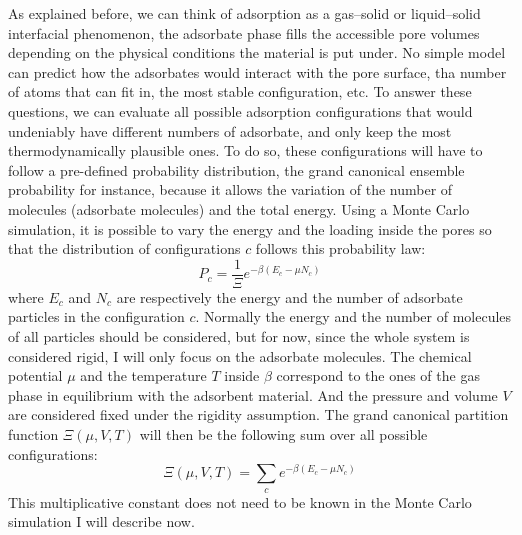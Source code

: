 \documentclass[main.tex]{subfiles}
\begin{document}
As explained before, we can think of adsorption as a gas--solid or liquid--solid interfacial phenomenon, the adsorbate phase fills the accessible pore volumes depending on the physical conditions the material is put under. No simple model can predict how the adsorbates would interact with the pore surface, tha number of atoms that can fit in, the most stable configuration, etc. To answer these questions, we can evaluate all possible adsorption configurations that would undeniably have different numbers of adsorbate, and only keep the most thermodynamically plausible ones. To do so, these configurations will have to follow a pre-defined probability distribution, the grand canonical ensemble probability for instance, because it allows the variation of the number of molecules (adsorbate molecules) and the total energy. Using a Monte Carlo simulation, it is possible to vary the energy and the loading inside the pores so that the distribution of configurations $c$ follows this probability law: 
\begin{equation}\label{eq:gc}
  P_c = \dfrac{1}{\Xi}e^{-\beta\left(E_c-\mu N_c\right)} 
\end{equation}
where $E_c$ and $N_c$ are respectively the energy and the number of adsorbate particles in the configuration $c$. Normally the energy and the number of molecules of all particles should be considered, but for now, since the whole system is considered rigid, I will only focus on the adsorbate molecules. The chemical potential $\mu$ and the temperature $T$ inside $\beta$ correspond to the ones of the gas phase in equilibrium with the adsorbent material. And the pressure and volume $V$ are considered fixed under the rigidity assumption. The grand canonical partition function $\Xi(\mu,V,T)$ will then be the following sum over all possible configurations: 
\begin{equation}
  \Xi(\mu,V,T) = \sum\limits_c e^{-\beta\left(E_c-\mu N_c\right)} 
\end{equation}
This multiplicative constant does not need to be known in the Monte Carlo simulation I will describe now. 
\end{document}
